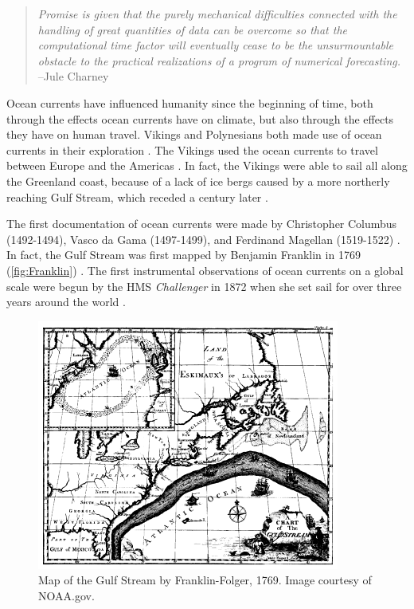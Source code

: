 \begin{quote}
\emph{Promise is given that the purely mechanical difficulties connected with the
handling of great quantities of data can be overcome so that the computational
time factor will eventually cease to be the unsurmountable obstacle to the
practical realizations of a program of numerical forecasting.} --Jule Charney
\end{quote}

Ocean currents have influenced humanity since the beginning of time, both
through the effects ocean currents have on climate, but also through the effects
they have on human travel. Vikings and Polynesians both made use of ocean
currents in their exploration \cite{Dijkstra08, Ingstad}. The Vikings used the
ocean currents to travel between Europe and the Americas \cite{Ingstad}. In
fact, the Vikings were able to sail all along the Greenland coast, because of a
lack of ice bergs caused by a more northerly reaching Gulf Stream, which receded
a century later \cite{Morner95}.

The first documentation of ocean currents were made by Christopher Columbus
(1492-1494), Vasco da Gama (1497-1499), and Ferdinand Magellan (1519-1522)
\cite{Dijkstra08, Vallis06}. In fact, the Gulf Stream was first mapped by
Benjamin Franklin in 1769 (\autoref{fig:Franklin}) \cite{Dijkstra08, Vallis06}.
The first instrumental observations of ocean currents on a global scale were
begun by the HMS \emph{Challenger} in 1872 when she set sail for over three
years around the world \cite{Siedler01}.

\begin{figure}%
  \begin{center}
    \includegraphics[scale=0.5]{Figures/Franklin-Folger.png}
    \caption{Map of the Gulf Stream by Franklin-Folger, 1769. Image courtesy of
      NOAA.gov.}
    \label{fig:Franklin}
  \end{center}
\end{figure}


